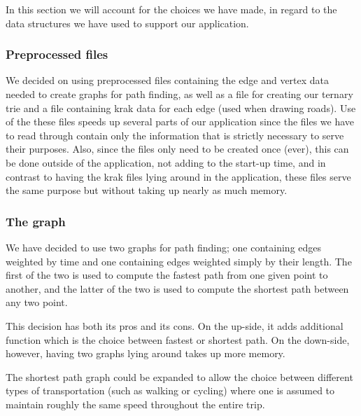 

In this section we will account for the choices we have made, in regard to the data structures we have used to support our application.

\subsubsection{Preprocessed files}
We decided on using preprocessed files containing the edge and vertex data needed to create graphs for path finding, as well as a file for creating our ternary trie and a file containing krak data for each edge (used when drawing roads). Use of the these files speeds up several parts of our application since the files we have to read through contain only the information that is strictly necessary to serve their purposes. Also, since the files only need to be created once (ever), this can be done outside of the application, not adding to the start-up time, and in contrast to having the krak files lying around in the application, these files serve the same purpose but without taking up nearly as much memory.

\subsubsection{The graph}
We have decided to use two graphs for path finding; one containing edges weighted by time and one containing edges weighted simply by their length. The first of the two is used to compute the fastest path from one given point to another, and the latter of the two is used to compute the shortest path between any two point.

This decision has both its pros and its cons. On the up-side, it adds additional function which is the choice between fastest or shortest path. On the down-side, however, having two graphs lying around takes up more memory.

The shortest path graph could be expanded to allow the choice between different types of transportation (such as walking or cycling) where one is assumed to maintain roughly the same speed throughout the entire trip.
